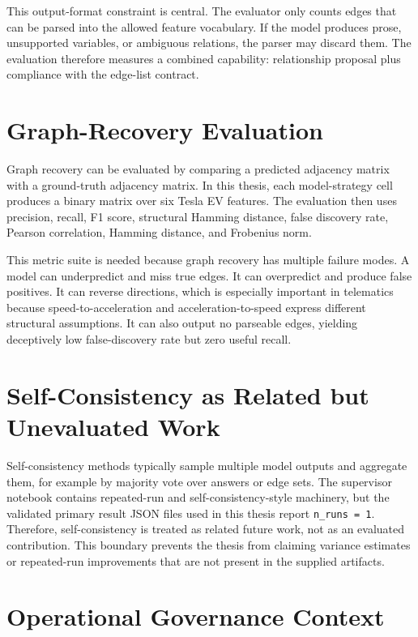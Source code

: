 This output-format constraint is central. The evaluator only counts edges that
can be parsed into the allowed feature vocabulary. If the model produces
prose, unsupported variables, or ambiguous relations, the parser may discard
them. The evaluation therefore measures a combined capability: relationship
proposal plus compliance with the edge-list contract.

\section{Graph-Recovery Evaluation}

Graph recovery can be evaluated by comparing a predicted adjacency matrix with
a ground-truth adjacency matrix. In this thesis, each model-strategy cell
produces a binary matrix over six Tesla EV features. The evaluation then uses
precision, recall, F1 score, structural Hamming distance, false discovery
rate, Pearson correlation, Hamming distance, and Frobenius norm.

This metric suite is needed because graph recovery has multiple failure
modes. A model can underpredict and miss true edges. It can overpredict and
produce false positives. It can reverse directions, which is especially
important in telematics because speed-to-acceleration and
acceleration-to-speed express different structural assumptions. It can also
output no parseable edges, yielding deceptively low false-discovery rate but
zero useful recall.

\section{Self-Consistency as Related but Unevaluated Work}

Self-consistency methods typically sample multiple model outputs and aggregate
them, for example by majority vote over answers or edge sets. The supervisor
notebook contains repeated-run and self-consistency-style machinery, but the
validated primary result JSON files used in this thesis report
\texttt{n\_runs = 1}. Therefore, self-consistency is treated as related future
work, not as an evaluated contribution. This boundary prevents the thesis from
claiming variance estimates or repeated-run improvements that are not present
in the supplied artifacts.

\section{Operational Governance Context}

